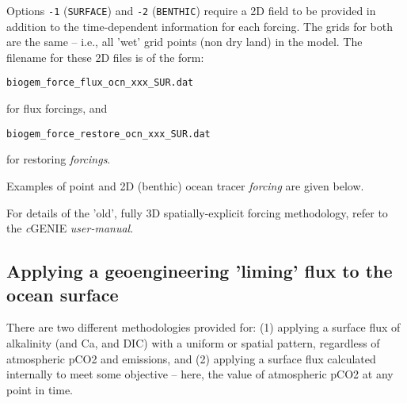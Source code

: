 \documentclass[10pt,twoside]{article}
\begin{document}
Options \texttt{-1} (\texttt{SURFACE}) and \texttt{-2} (\texttt{BENTHIC}) require a 2D field to be provided in addition to the time-dependent information for each forcing. The grids for both are the same -- i.e., all 'wet' grid points (non dry land) in the model. The filename for these 2D files is of the form:
\vspace{-10pt}\begin{verbatim}
biogem_force_flux_ocn_xxx_SUR.dat
\end{verbatim}\vspace{-10pt}
for flux forcings, and 
\vspace{-10pt}\begin{verbatim}
biogem_force_restore_ocn_xxx_SUR.dat
\end{verbatim}\vspace{-10pt}
for restoring \textit{forcings}.

Examples of point and 2D (benthic) ocean tracer \textit{forcing} are given below.
        
For details of the 'old', fully 3D spatially-explicit forcing methodology, refer to the \textit{c}GENIE \textit{user-manual}.


\subsection{Applying a geoengineering 'liming' flux to the ocean surface}

There are two different methodologies provided for: (1) applying a surface flux of alkalinity (and Ca, and DIC) with a uniform or spatial pattern, regardless of atmospheric pCO2 and emissions, and (2) applying a surface flux calculated internally to meet some objective -- here, the value of atmospheric pCO2 at any point in time.
\end{document}
